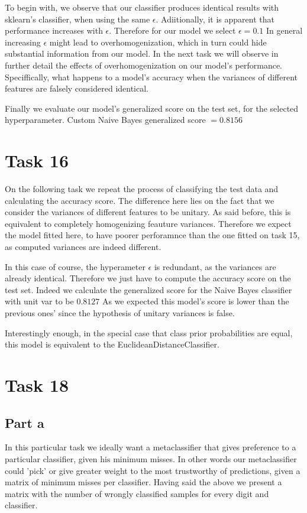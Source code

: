 \documentclass{article}
\begin{document}
    To begin with, we observe that our classifier produces identical results with sklearn's classifier, when using the same $\epsilon$.
    Adiitionally, it is apparent that performance increases with $\epsilon$.
    Therefore for our model we select $\epsilon = 0.1$
    In general increasing $\epsilon$ might lead to overhomogenization, which in turn could hide substantial information from our model.
    In the next task we will observe in further detail the effects of overhomogenization on our model's performance.
    Speciffically, what happens to a model's accuracy when the variances of different features are falsely considered identical.

    Finally we evaluate our model's generalized score on the test set, for the selected hyperparameter.
    Custom Naive Bayes generalized score $= 0.8156$

    \section{Task 16}
    On the following task we repeat the process of classifying the test data and calculating the accuracy score.
    The difference here lies on the fact that we consider the variances of different features to be unitary.
    As said before, this is equivalent to completely homogenizing feauture variances.
    Therefore we expect the model fitted here, to have poorer perforamnce than the one fitted on task 15, as computed variances are indeed different.

    In this case of course, the hyperameter $\epsilon$ is redundant, as the variances are already identical.
    Therefore we just have to compute the accuracy score on the test set.
    Indeed we calculate the generalized score for the Naive Bayes classifier with unit var to be $0.8127$
    As we expected this model's score is lower than the previous ones' since the hypothesis of unitary variances is false.
    
    Interestingly enough, in the special case that class prior probabilities are equal,
    this model is equivalent to the EuclideanDistanceClassifier.

    \section{Task 18}
        \subsection{Part a}
    In this particular task we ideally want a metaclassifier that gives preference to a particular classifier, given his minimum misses.
    In other words our metaclassifier could 'pick' or give greater weight to the most trustworthy of predictions, given a matrix of minimum misses per classifier.
    Having said the above we present a matrix with the number of wrongly classified samples for every digit and classifier.
\end{document}
